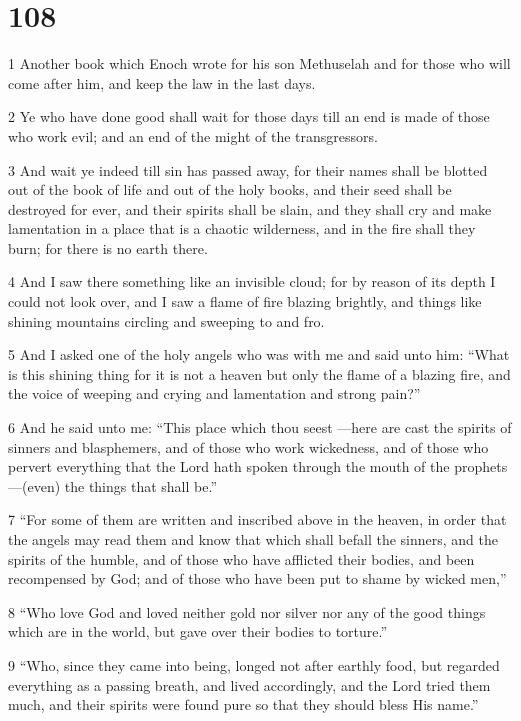 \chapter{108}

\par 1 Another book which Enoch wrote for his son Methuselah and for those who will come after him, and keep the law in the last days.
\par 2 Ye who have done good shall wait for those days till an end is made of those who work evil; and an end of the might of the transgressors.
\par 3 And wait ye indeed till sin has passed away, for their names shall be blotted out of the book of life and out of the holy books, and their seed shall be destroyed for ever, and their spirits shall be slain, and they shall cry and make lamentation in a place that is a chaotic wilderness, and in the fire shall they burn; for there is no earth there.
\par 4 And I saw there something like an invisible cloud; for by reason of its depth I could not look over, and I saw a flame of fire blazing brightly, and things like shining mountains circling and sweeping to and fro.
\par 5 And I asked one of the holy angels who was with me and said unto him: “What is this shining thing for it is not a heaven but only the flame of a blazing fire, and the voice of weeping and crying and lamentation and strong pain?”
\par 6 And he said unto me: “This place which thou seest —here are cast the spirits of sinners and blasphemers, and of those who work wickedness, and of those who pervert everything that the Lord hath spoken through the mouth of the prophets —(even) the things that shall be.”
\par 7 “For some of them are written and inscribed above in the heaven, in order that the angels may read them and know that which shall befall the sinners, and the spirits of the humble, and of those who have afflicted their bodies, and been recompensed by God; and of those who have been put to shame by wicked men,”
\par 8 “Who love God and loved neither gold nor silver nor any of the good things which are in the world, but gave over their bodies to torture.”
\par 9 “Who, since they came into being, longed not after earthly food, but regarded everything as a passing breath, and lived accordingly, and the Lord tried them much, and their spirits were found pure so that they should bless His name.”
